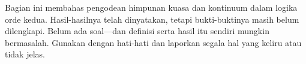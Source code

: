 \documentclass[../../../include/open-logic-chapter]{subfiles}
\begin{document}

\begin{editorial}
Bagian ini membahas pengodean himpunan kuasa dan kontinuum dalam
logika orde kedua. Hasil-hasilnya telah dinyatakan, tetapi bukti-buktinya
masih belum dilengkapi. Belum ada soal---dan definisi serta hasil itu sendiri
mungkin bermasalah. Gunakan dengan hati-hati dan laporkan segala hal yang
keliru atau tidak jelas.
\end{editorial}





\OLEndChapterHook
\end{document}
